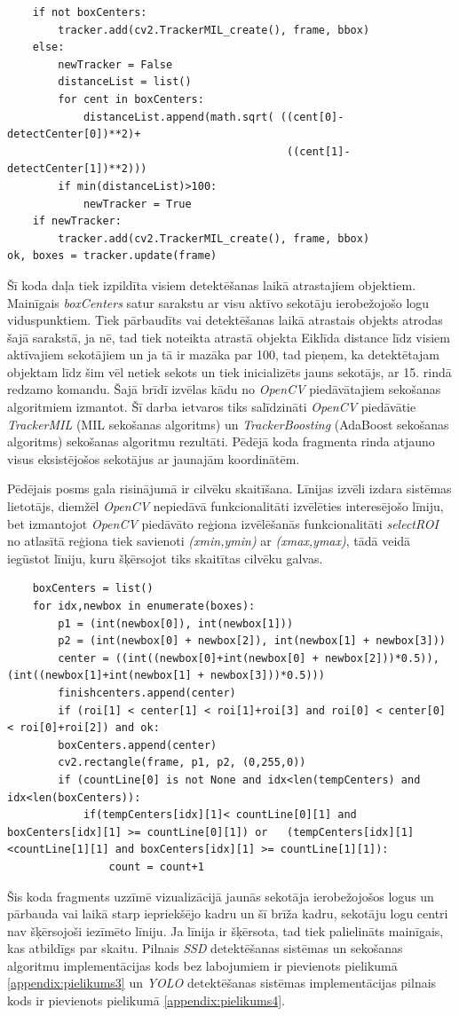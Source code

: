 \begin{lstlisting}   
	if not boxCenters:
		tracker.add(cv2.TrackerMIL_create(), frame, bbox)
	else:
		newTracker = False
		distanceList = list()
		for cent in boxCenters:
			distanceList.append(math.sqrt( ((cent[0]-detectCenter[0])**2)+
											((cent[1]-detectCenter[1])**2)))
		if min(distanceList)>100:
			newTracker = True
	if newTracker:
		tracker.add(cv2.TrackerMIL_create(), frame, bbox)
ok, boxes = tracker.update(frame)
\end{lstlisting}

Šī koda daļa tiek izpildīta visiem detektēšanas laikā atrastajiem objektiem. Mainīgais \textit{boxCenters} satur sarakstu ar visu aktīvo sekotāju ierobežojošo logu viduspunktiem. Tiek pārbaudīts vai detektēšanas laikā atrastais objekts atrodas šajā sarakstā, ja nē, tad tiek noteikta atrastā objekta Eiklīda distance līdz visiem aktīvajiem sekotājiem un ja tā ir mazāka par 100, tad pieņem, ka detektētajam objektam līdz šim vēl netiek sekots un tiek inicializēts jauns sekotājs, ar 15. rindā redzamo komandu. Šajā brīdī izvēlas kādu no \textit{OpenCV} piedāvātajiem sekošanas algoritmiem izmantot. Šī darba ietvaros tiks salīdzināti \textit{OpenCV} piedāvātie \textit{TrackerMIL} (MIL sekošanas algoritms) un \textit{TrackerBoosting} (AdaBoost sekošanas algoritms) sekošanas algoritmu rezultāti. Pēdējā koda fragmenta rinda atjauno visus eksistējošos sekotājus ar jaunajām koordinātēm. 

Pēdējais posms gala risinājumā ir cilvēku skaitīšana. Līnijas izvēli izdara sistēmas lietotājs, diemžēl \textit{OpenCV} nepiedāvā funkcionalitāti izvēlēties interesējošo līniju, bet izmantojot \textit{OpenCV} piedāvāto reģiona izvēlēšanās funkcionalitāti \textit{selectROI} no atlasītā reģiona tiek savienoti \textit{(xmin,ymin)} ar \textit{(xmax,ymax)}, tādā veidā iegūstot līniju, kuru šķērsojot tiks skaitītas cilvēku galvas.
\newpage
\begin{lstlisting}
	boxCenters = list()
	for idx,newbox in enumerate(boxes):            
		p1 = (int(newbox[0]), int(newbox[1]))
		p2 = (int(newbox[0] + newbox[2]), int(newbox[1] + newbox[3]))
		center = ((int((newbox[0]+int(newbox[0] + newbox[2]))*0.5)),(int((newbox[1]+int(newbox[1] + newbox[3]))*0.5)))
		finishcenters.append(center)
		if (roi[1] < center[1] < roi[1]+roi[3] and roi[0] < center[0] < roi[0]+roi[2]) and ok:
		boxCenters.append(center)
		cv2.rectangle(frame, p1, p2, (0,255,0))
		if (countLine[0] is not None and idx<len(tempCenters) and idx<len(boxCenters)):
			if(tempCenters[idx][1]< countLine[0][1] and boxCenters[idx][1] >= countLine[0][1]) or 	(tempCenters[idx][1]<countLine[1][1] and boxCenters[idx][1] >= countLine[1][1]):
				count = count+1
\end{lstlisting}

Šis koda fragments uzzīmē vizualizācijā jaunās sekotāja ierobežojošos logus un pārbauda vai laikā starp iepriekšējo kadru un šī brīža kadru, sekotāju logu centri nav šķērsojoši iezīmēto līniju. Ja līnija ir šķērsota, tad tiek palielināts mainīgais, kas atbildīgs par skaitu. Pilnais \textit{SSD} detektēšanas sistēmas un sekošanas algoritmu implementācijas kods bez labojumiem ir pievienots pielikumā \ref{appendix:pielikums3} un \textit{YOLO} detektēšanas sistēmas implementācijas pilnais kods ir pievienots pielikumā \ref{appendix:pielikums4}.